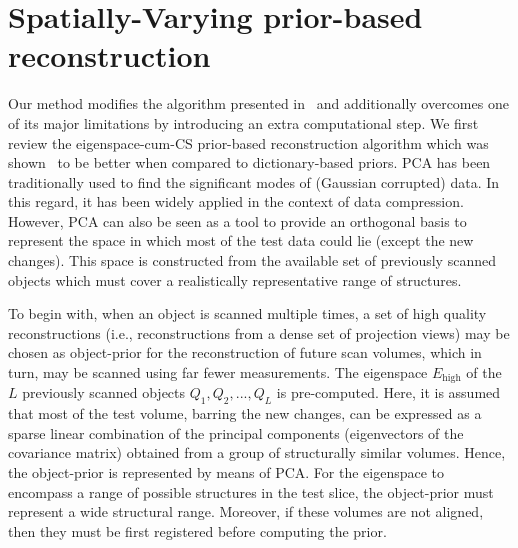 \documentclass[journal]{IEEEtran}
\begin{document}
\section{Spatially-Varying prior-based reconstruction}
\label{sec:method_spatially_varying_prior}
Our method modifies the algorithm presented in~\cite{my_dicta_paper}
and additionally overcomes one of its major limitations by introducing
an extra computational step. We first review the eigenspace-cum-CS
prior-based reconstruction algorithm which was
shown~\cite{my_dicta_paper} to be better when compared to
dictionary-based priors. PCA has been traditionally used
to find the significant modes of (Gaussian corrupted) data. In this
regard, it has been widely applied in the context of data
compression. However, PCA can also be seen as a tool to provide an
orthogonal basis to represent the space in which most of the test data
could lie (except the new changes). This space is constructed from the
available set of previously scanned objects which must cover a
realistically representative range of structures. %

To begin with,
when an object is scanned multiple times, a set of high quality
reconstructions (i.e., reconstructions from a dense set of
projection views) may be chosen as object-prior for the reconstruction
of future scan volumes, which in turn, may be scanned using far fewer
measurements. The eigenspace $E_{\text{high}}$ of the $L$ previously
scanned objects $Q_1,Q_2,...,Q_L$ is pre-computed. Here, it is assumed
that most of the test volume, barring the new changes, can be
expressed as a sparse linear combination of the principal components
(eigenvectors of the covariance matrix) obtained from a group of
structurally similar volumes. Hence, the object-prior is represented
by means of PCA. For the eigenspace to encompass a range of possible
structures in the test slice, the object-prior must represent a wide
structural range. Moreover, if these volumes are not aligned, then
they must be first registered before computing the prior.
\end{document}

